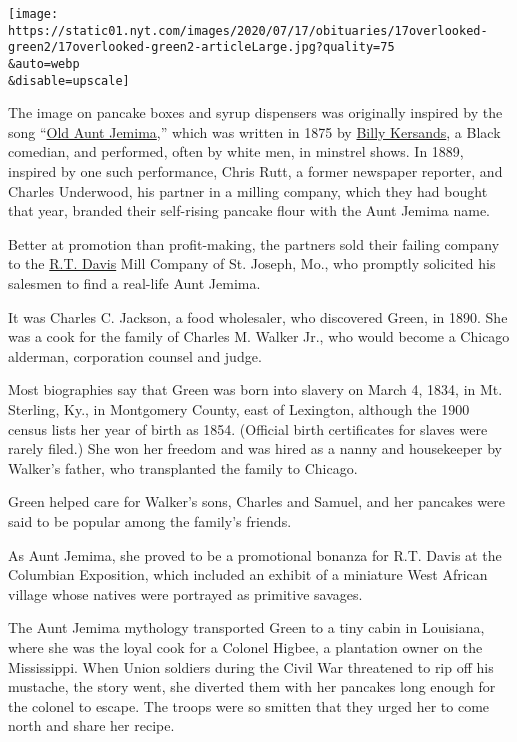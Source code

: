 \texttt{[image: https://static01.nyt.com/images/2020/07/17/obituaries/17overlooked-green2/17overlooked-green2-articleLarge.jpg?quality=75\\\&auto=webp\\\&disable=upscale]}

The image on pancake boxes and syrup dispensers was originally inspired
by the song ``\href{https://www.youtube.com/watch?v=92EwphX3eJI}{Old
Aunt Jemima},'' which was written in 1875 by
\href{https://nkaa.uky.edu/nkaa/items/show/2433}{Billy Kersands}, a
Black comedian, and performed, often by white men, in minstrel shows. In
1889, inspired by one such performance, Chris Rutt, a former newspaper
reporter, and Charles Underwood, his partner in a milling company, which
they had bought that year, branded their self-rising pancake flour with
the Aunt Jemima name.

Better at promotion than profit-making, the partners sold their failing
company to the \href{https://chicagology.com/columbiaexpo/fair038/}{R.T.
Davis} Mill Company of St. Joseph, Mo., who promptly solicited his
salesmen to find a real-life Aunt Jemima.

It was Charles C. Jackson, a food wholesaler, who discovered Green, in
1890. She was a cook for the family of Charles M. Walker Jr., who would
become a Chicago alderman, corporation counsel and judge.

Most biographies say that Green was born into slavery on March 4, 1834,
in Mt. Sterling, Ky., in Montgomery County, east of Lexington, although
the 1900 census lists her year of birth as 1854. (Official birth
certificates for slaves were rarely filed.) She won her freedom and was
hired as a nanny and housekeeper by Walker's father, who transplanted
the family to Chicago.

Green helped care for Walker's sons, Charles and Samuel, and her
pancakes were said to be popular among the family's friends.

As Aunt Jemima, she proved to be a promotional bonanza for R.T. Davis at
the Columbian Exposition, which included an exhibit of a miniature West
African village whose natives were portrayed as primitive savages.

The Aunt Jemima mythology transported Green to a tiny cabin in
Louisiana, where she was the loyal cook for a Colonel Higbee, a
plantation owner on the Mississippi. When Union soldiers during the
Civil War threatened to rip off his mustache, the story went, she
diverted them with her pancakes long enough for the colonel to escape.
The troops were so smitten that they urged her to come north and share
her recipe.

